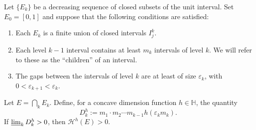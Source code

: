 \documentclass[11pt,a4paper]{amsart}
\begin{document}
\begin{lemma}\label{lem:cantorgeneral}
Let $\{E_k\}$ be a decreasing sequence of closed subsets of the
unit interval. Set $E_0=[0,1]$ and suppose that the following
conditions are satisfied:
\begin{enumerate}
    \item Each $E_k$ is a finite union of closed intervals $I^k_j$.
    \item \label{eq:mk} Each level $k-1$ interval contains at least $m_k$ intervals of level $k$. We will refer to these as the ``children'' of an interval.
    \item The gaps between the intervals of level $k$ are at least of size ${\varepsilon}_k$, with $0<{\varepsilon}_{k+1}<{\varepsilon}_k$.
\end{enumerate}
Let $E=\bigcap_k E_k$. Define, for a concave dimension
function $h\in{\mathbb{H}}$, the quantity
\begin{equation*}
D^h_k:=m_1\cdot m_2\cdots m_{k-1}h({\varepsilon}_km_k).
\end{equation*}
If $\varliminf_k D^h_k>0$, then ${\mathcal{H}^{{h}}}(E)>0$.
\end{lemma}
\end{document}
